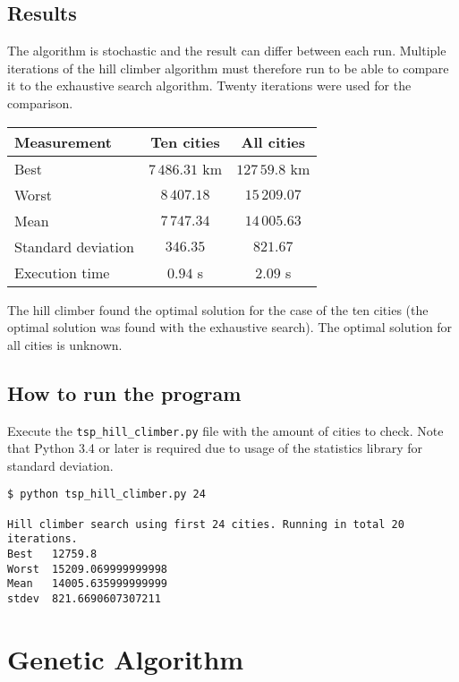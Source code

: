\documentclass{article}
\begin{document}
\subsection*{Results}

The algorithm is stochastic and the result can differ between each run. Multiple iterations of the hill climber algorithm must therefore run to be able to compare it to the exhaustive search algorithm. Twenty iterations were used for the comparison.

\begin{center}
\begin{tabular}{lcc}
\toprule
Measurement & Ten cities & All cities \\
\midrule
Best & $7\,486.31$ km & $127\,59.8$ km \\
Worst & $8\,407.18$ & $15\,209.07$ \\
Mean & $7\,747.34$ & $14\,005.63$ \\
Standard deviation & $346.35$ & $821.67$ \\
Execution time & $0.94$ s & $2.09$ s \\
\bottomrule
\end{tabular}
\end{center}

The hill climber found the optimal solution for the case of the ten cities (the optimal solution was found with the exhaustive search). The optimal solution for all cities is unknown.

\subsection*{How to run the program}

Execute the \texttt{tsp\_hill\_climber.py} file with the amount of cities to check. Note that Python 3.4 or later is required due to usage of the statistics library for standard deviation.

\begin{verbatim}
$ python tsp_hill_climber.py 24

Hill climber search using first 24 cities. Running in total 20
iterations.
Best   12759.8
Worst  15209.069999999998
Mean   14005.635999999999
stdev  821.6690607307211
\end{verbatim}


\section*{Genetic Algorithm}
\end{document}

